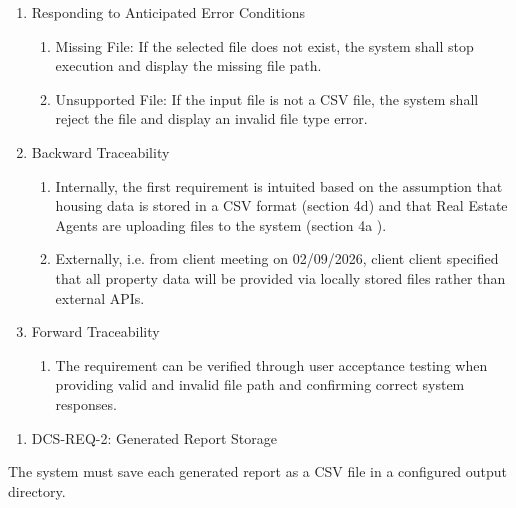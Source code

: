 \documentclass[
]{article}
\begin{document}
\begin{enumerate}
\def\labelenumi{\alph{enumi}.}
\item
  Responding to Anticipated Error Conditions

  \begin{enumerate}
  \def\labelenumii{\roman{enumii}.}
  \item
    Missing File: If the selected file does not exist, the system shall
    stop execution and display the missing file path.
  \item
    Unsupported File: If the input file is not a CSV file, the system
    shall reject the file and display an invalid file type error.
  \end{enumerate}
\item
  Backward Traceability

  \begin{enumerate}
  \def\labelenumii{\roman{enumii}.}
  \item
    Internally, the first requirement is intuited based on the
    assumption that housing data is stored in a CSV format (section 4d)
    and that Real Estate Agents are uploading files to the system
    (section 4a ).
  \item
    Externally, i.e. from client meeting on 02/09/2026, client client
    specified that all property data will be provided via locally stored
    files rather than external APIs.
  \end{enumerate}
\item
  Forward Traceability

  \begin{enumerate}
  \def\labelenumii{\roman{enumii}.}
  \item
    The requirement can be verified through user acceptance testing when
    providing valid and invalid file path and confirming correct system
    responses.
  \end{enumerate}
\end{enumerate}

\begin{enumerate}
\def\labelenumi{\Roman{enumi})}
\setcounter{enumi}{3}
\item
  DCS-REQ-2: Generated Report Storage
\end{enumerate}

The system must save each generated report as a CSV file in a configured
output directory.
\end{document}
